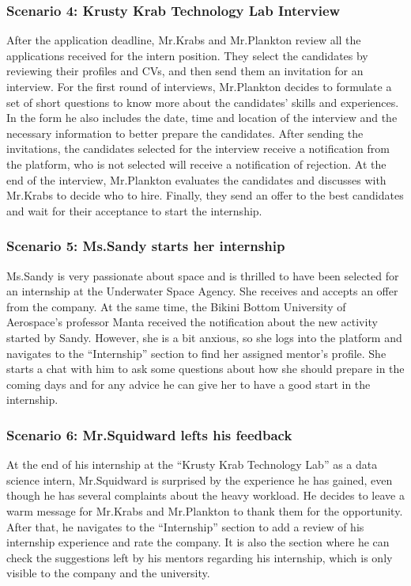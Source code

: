 \subsubsection{Scenario 4: Krusty Krab Technology Lab Interview}\label{subsubsec:scenario_4}
After the application deadline, Mr.Krabs and Mr.Plankton review all the applications received for the intern position. They select the
candidates by reviewing their profiles and CVs, and then send them an invitation for an interview. For the first round of interviews, Mr.Plankton
decides to formulate a set of short questions to know more about the candidates' skills and experiences. In the form he also includes the date,
time and location of the interview and the necessary information to better prepare the candidates. After sending the invitations, the candidates
selected for the interview receive a notification from the platform, who is not selected will receive a notification of rejection. At the end of 
the interview, Mr.Plankton evaluates the candidates and discusses with Mr.Krabs to decide who to hire. Finally, they send an offer to the
best candidates and wait for their acceptance to start the internship.

\subsubsection{Scenario 5: Ms.Sandy starts her internship}\label{subsubsec:scenario_5}
Ms.Sandy is very passionate about space and is thrilled to have been selected for an internship at the Underwater Space Agency. She receives 
and accepts an offer from the company. At the same time, the Bikini Bottom University of Aerospace's professor Manta received the notification
about the new activity started by Sandy. However, she is a bit anxious, so she logs into the platform and navigates to the ``Internship'' 
section to find her assigned mentor's profile. She starts a chat with him to ask some questions about how she should prepare in the coming days
and for any advice he can give her to have a good start in the internship.

\subsubsection{Scenario 6: Mr.Squidward lefts his feedback}\label{subsubsec:scenario_6}
At the end of his internship at the ``Krusty Krab Technology Lab'' as a data science intern, Mr.Squidward is surprised by the experience 
he has gained, even though he has several complaints about the heavy workload. He decides to leave a warm message for Mr.Krabs and Mr.Plankton 
to thank them for the opportunity. After that, he navigates to the ``Internship'' section to add a review of his internship experience and rate 
the company. It is also the section where he can check the suggestions left by his mentors regarding his internship, which is only visible to the 
company and the university.

